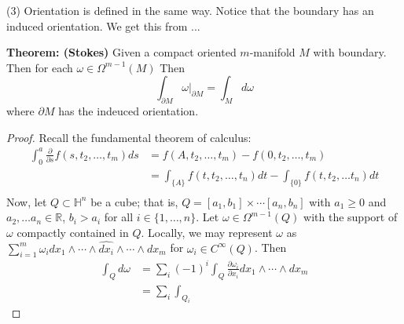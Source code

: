 \documentclass{article}
\begin{document}
(3) Orientation is defined in the same way. Notice that the boundary has an induced orientation. We get this from ...

\textbf{Theorem: (Stokes)} Given a compact oriented $m$-manifold $M$ with boundary. Then for each $\omega \in \Omega^{m-1}(M)$ Then
\[
\int_{\partial M} \omega|_{\partial M} = \int_M d\omega
\]
where $\partial M$ has the indeuced orientation.

\begin{proof} Recall the fundamental theorem of calculus:
\begin{align*}
\int_0^a \frac{\partial}{\partial s} f(s, t_2, \ldots, t_m) ds & = f(A, t_2, \ldots, t_m) - f(0, t_2, \ldots, t_m) \\
& = \int_{\{ A \}} f(t, t_2, \ldots, t_n) dt - \int_{\{ 0 \}}f(t, t_2, \ldots t_n)dt \\
\end{align*}
Now, let $Q \subset \mathbb{H}^n$ be a cube; that is, $Q = [a_1, b_1] \times \cdots [a_n, b_n]$ with $a_1 \geq 0$ and $a_2,\ldots a_n \in \mathbb{R}$, $b_i > a_i$ for all $i \in \{ 1, \ldots, n \}$. Let $\omega \in \Omega^{m-1}(Q)$ with the support of $\omega$ compactly contained in $Q$. Locally, we may represent $\omega$ as $\sum_{i=1}^m \omega_i dx_1 \wedge \cdots \wedge \hat{dx_i} \wedge \cdots \wedge dx_m$ for $\omega_i \in C^\infty(Q)$. Then
\begin{align*}
\int_Q d\omega & = \sum_i (-1)^i \int_Q \frac{\partial \omega_i}{\partial x_i}dx_1 \wedge \cdots \wedge dx_m \\
& = \sum_i \int_{Q_i}
\end{align*}

\end{proof}
\end{document}
